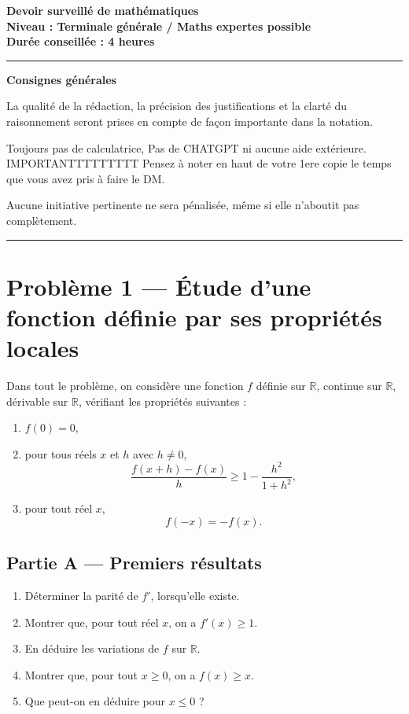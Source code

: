 \documentclass[11pt,a4paper]{article}
\newcommand{\R}{\mathbb{R}}
\begin{document}
\begin{center}
    {\LARGE \textbf{Devoir surveillé de mathématiques}}\\[0.5em]
    {\large \textbf{Niveau : Terminale générale / Maths expertes possible}}\\[0.5em]
    \textbf{Durée conseillée : 4 heures}
\end{center}

\hrule
\vspace{0.8em}

\textbf{Consignes générales}

La qualité de la rédaction, la précision des justifications et la clarté du raisonnement seront prises en compte de façon importante dans la notation.

Toujours pas de calculatrice, Pas de CHATGPT ni aucune aide extérieure.
IMPORTANTTTTTTTTT 
Pensez à noter en haut de votre 1ere copie le temps que vous avez pris à faire le DM.

Aucune initiative pertinente ne sera pénalisée, même si elle n’aboutit pas complètement.

\vspace{1em}
\hrule
\vspace{1em}

\section*{Problème 1 --- Étude d’une fonction définie par ses propriétés locales}

Dans tout le problème, on considère une fonction \(f\) définie sur \(\R\), continue sur \(\R\), dérivable sur \(\R\), vérifiant les propriétés suivantes :
\begin{enumerate}[label=\arabic*.]
    \item \(f(0)=0\),
    \item pour tous réels \(x\) et \(h\) avec \(h\neq 0\),
    \[
    \frac{f(x+h)-f(x)}{h} \ge 1-\frac{h^2}{1+h^2},
    \]
    \item pour tout réel \(x\),
    \[
    f(-x)=-f(x).
    \]
\end{enumerate}



\subsection*{Partie A --- Premiers résultats}

\begin{enumerate}[label=\arabic*.]
    \item Déterminer la parité de \(f'\), lorsqu’elle existe.
    \item Montrer que, pour tout réel \(x\), on a \(f'(x)\ge 1\).
    \item En déduire les variations de \(f\) sur \(\R\).
    \item Montrer que, pour tout \(x\ge 0\), on a \(f(x)\ge x\).
    \item Que peut-on en déduire pour \(x\le 0\) ?
\end{enumerate}
\end{document}

